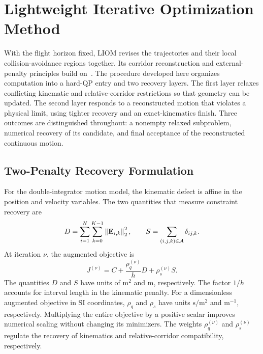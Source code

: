 \section{Lightweight Iterative Optimization Method}
\label{sec:liom}
With the flight horizon fixed, LIOM revises the trajectories and their local collision-avoidance regions together. Its corridor reconstruction and external-penalty principles build on~\cite{bu2025,li2022liom}. The procedure developed here organizes computation into a hard-QP entry and two recovery layers. The first layer relaxes conflicting kinematic and relative-corridor restrictions so that geometry can be updated. The second layer responds to a reconstructed motion that violates a physical limit, using tighter recovery and an exact-kinematics finish. Three outcomes are distinguished throughout: a nonempty relaxed subproblem, numerical recovery of its candidate, and final acceptance of the reconstructed continuous motion.

\subsection{Two-Penalty Recovery Formulation}
For the double-integrator motion model, the kinematic defect is affine in the position and velocity variables. The two quantities that measure constraint recovery are
\begin{equation}
 D=\sum_{i=1}^N\sum_{k=0}^{K-1}\left\lVert \mathbf E_{i,k}\right\rVert_2^2,\qquad
 S=\sum_{(i,j,k)\in\mathcal A}\delta_{ij,k}.
 \label{eq:recovery}
\end{equation}
At iteration $\nu$, the augmented objective is
\begin{equation}
 J^{(\nu)}=C+\frac{\rho_q^{(\nu)}}hD+\rho_s^{(\nu)}S.
 \label{eq:penalty}
\end{equation}
The quantities $D$ and $S$ have units of $\mathrm{m}^2$ and $\mathrm{m}$, respectively. The factor $1/h$ accounts for interval length in the kinematic penalty. For a dimensionless augmented objective in SI coordinates, $\rho_q$ and $\rho_s$ have units $\mathrm{s}/\mathrm{m}^2$ and $\mathrm{m}^{-1}$, respectively. Multiplying the entire objective by a positive scalar improves numerical scaling without changing its minimizers. The weights $\rho_q^{(\nu)}$ and $\rho_s^{(\nu)}$ regulate the recovery of kinematics and relative-corridor compatibility, respectively.

